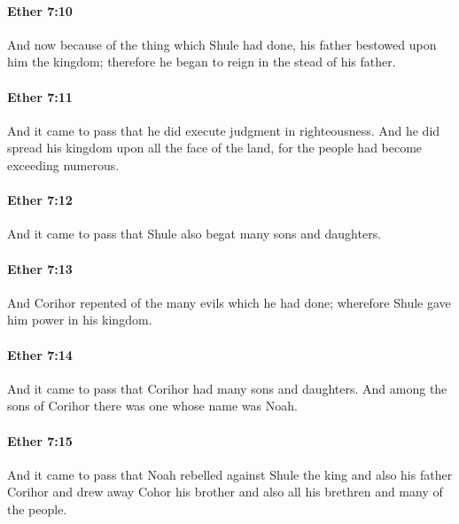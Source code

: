		\paragraph{Ether 7:10} %
			\label{ETHER-7-10}

			And now because of the thing which Shule had done,
			his father bestowed upon him the kingdom;
			therefore he began to reign in the stead of his father.

		\paragraph{Ether 7:11} %
			\label{ETHER-7-11}

			And it came to pass that he did execute judgment in righteousness.
			And he did spread his kingdom upon all the face of the land,
			for the people had become exceeding numerous.

		\paragraph{Ether 7:12} %
			\label{ETHER-7-12}

			And it came to pass that Shule also begat many sons and daughters.

		\paragraph{Ether 7:13} %
			\label{ETHER-7-13}

			And Corihor repented of the many evils which he had done;
			wherefore Shule gave him power in his kingdom.

		\paragraph{Ether 7:14} %
			\label{ETHER-7-14}

			And it came to pass that Corihor had many sons and daughters.
			And among the sons of Corihor there was one whose name was Noah.

		\paragraph{Ether 7:15} %
			\label{ETHER-7-15}

			And it came to pass that
			Noah rebelled against Shule the king and also his father Corihor
			and drew away Cohor his brother
			and also all his brethren and many of the people.

